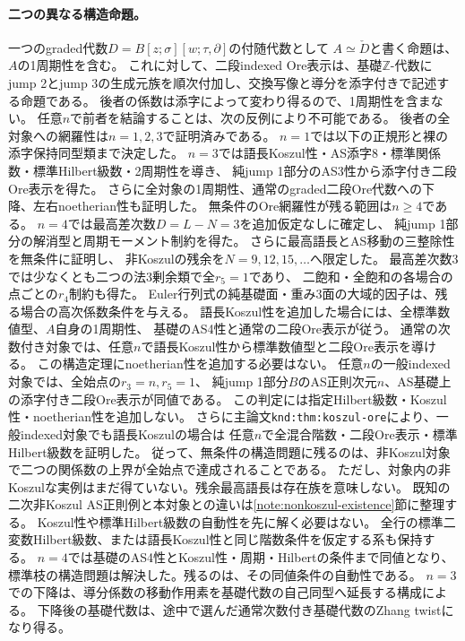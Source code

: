 \documentclass[11pt,a4paper]{ltjsarticle}
\begin{document}
\paragraph{二つの異なる構造命題。}
一つのgraded代数$D=B[z;\sigma][w;\tau,\partial]$の付随代数として
$A\simeq\check D$と書く命題は、$A$の1周期性を含む。
これに対して、二段indexed Ore表示は、基礎$\mathbb Z$-代数に
jump 2とjump 3の生成元族を順次付加し、交換写像と導分を添字付きで記述する命題である。
後者の係数は添字によって変わり得るので、1周期性を含まない。
任意$n$で前者を結論することは、次の反例により不可能である。
後者の全対象への網羅性は$n=1,2,3$で証明済みである。
$n=1$では以下の正規形と裸の添字保持同型類まで決定した。
$n=3$では語長Koszul性・AS添字8・標準関係数・標準Hilbert級数・2周期性を導き、
純jump 1部分のAS3性から添字付き二段Ore表示を得た。
さらに全対象の1周期性、通常のgraded二段Ore代数への下降、左右noetherian性も証明した。
無条件のOre網羅性が残る範囲は$n\geq4$である。
$n=4$では最高差次数$D=L-N=3$を追加仮定なしに確定し、
純jump 1部分の解消型と周期モーメント制約を得た。
さらに最高語長とAS移動の三整除性を無条件に証明し、
非Koszulの残余を$N=9,12,15,\ldots$へ限定した。
最高差次数3では少なくとも二つの法3剰余類で全$r_5=1$であり、
二飽和・全飽和の各場合の点ごとの$r_4$制約も得た。
Euler行列式の純基礎面・重み3面の大域的因子は、残る場合の高次係数条件を与える。
語長Koszul性を追加した場合には、全標準数値型、$A$自身の1周期性、
基礎のAS4性と通常の二段Ore表示が従う。
通常の次数付き対象では、任意$n$で語長Koszul性から標準数値型と二段Ore表示を導ける。
この構造定理にnoetherian性を追加する必要はない。
任意$n$の一般indexed対象では、全始点の$r_3=n,r_5=1$、
純jump 1部分$B$のAS正則次元$n$、AS基礎上の添字付き二段Ore表示が同値である。
この判定には指定Hilbert級数・Koszul性・noetherian性を追加しない。
さらに主論文\texttt{knd:thm:koszul-ore}により、一般indexed対象でも語長Koszulの場合は
任意$n$で全混合階数・二段Ore表示・標準Hilbert級数を証明した。
従って、無条件の構造問題に残るのは、非Koszul対象で二つの関係数の上界が全始点で達成されることである。
ただし、対象内の非Koszulな実例はまだ得ていない。残余最高語長は存在族を意味しない。
既知の二次非Koszul AS正則例と本対象との違いは\ref{note:nonkoszul-existence}節に整理する。
Koszul性や標準Hilbert級数の自動性を先に解く必要はない。
全行の標準二変数Hilbert級数、または語長Koszul性と同じ階数条件を仮定する系も保持する。
$n=4$では基礎のAS4性とKoszul性・周期・Hilbertの条件まで同値となり、
標準枝の構造問題は解決した。残るのは、その同値条件の自動性である。
$n=3$での下降は、導分係数の移動作用素を基礎代数の自己同型へ延長する構成による。
下降後の基礎代数は、途中で選んだ通常次数付き基礎代数のZhang twistになり得る。
\end{document}
